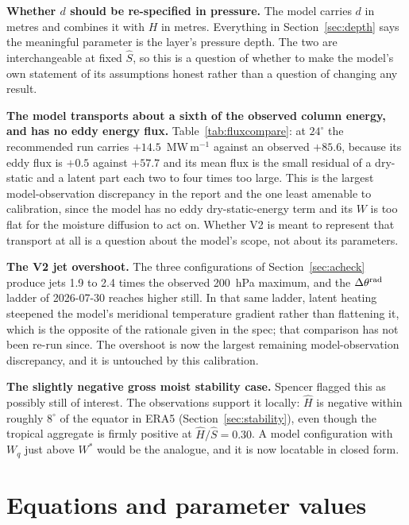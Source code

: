 \documentclass[11pt]{article}
\newcommand{\Shat}{\hat S}
\newcommand{\Hhat}{\hat H}
\newcommand{\Wq}{W_q}
\newcommand{\Wstar}{W^*}
\begin{document}
\textbf{Whether $d$ should be re-specified in pressure.} The model carries $d$
in metres and combines it with $H$ in metres. Everything in
Section~\ref{sec:depth} says the meaningful parameter is the layer's pressure
depth. The two are interchangeable at fixed $\Shat$, so this is a question of
whether to make the model's own statement of its assumptions honest rather than
a question of changing any result.

\textbf{The model transports about a sixth of the observed column energy, and
has no eddy energy flux.} Table~\ref{tab:fluxcompare}: at $24^\circ$ the
recommended run carries $+14.5$~MW\,m$^{-1}$ against an observed $+85.6$,
because its eddy flux is $+0.5$ against $+57.7$ and its mean flux is the small
residual of a dry-static and a latent part each two to four times too large.
This is the largest model-observation discrepancy in the report and the one
least amenable to calibration, since the model has no eddy dry-static-energy
term and its $W$ is too flat for the moisture diffusion to act on. Whether V2
is meant to represent that transport at all is a question about the model's
scope, not about its parameters.

\textbf{The V2 jet overshoot.} The three configurations of
Section~\ref{sec:acheck} produce jets 1.9 to 2.4 times the observed 200~hPa
maximum, and the $\Delta\theta^{\rm rad}$ ladder of 2026-07-30 reaches higher
still. In that same ladder, latent heating steepened the model's meridional
temperature gradient rather than flattening it, which is the opposite of the
rationale given in the spec; that comparison has not been re-run since. The
overshoot is now the largest remaining model-observation discrepancy, and it is
untouched by this calibration.

\textbf{The slightly negative gross moist stability case.} Spencer flagged
this as possibly still of interest. The observations support it locally:
$\Hhat$ is negative within roughly $8^\circ$ of the equator in ERA5
(Section~\ref{sec:stability}), even though the tropical aggregate is firmly
positive at $\Hhat/\Shat = 0.30$. A model configuration with $\Wq$ just above
$\Wstar$ would be the analogue, and it is now locatable in closed form.

\appendix

\section{Equations and parameter values}
\label{app:eqs}
\end{document}
